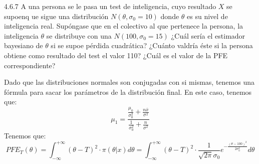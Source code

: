 \begin{problem}{4.6.7}
  A una persona se le pasa un test de inteligencia, cuyo resultado $X$ se supoenq ue sigue una distribución $N(\theta, \sigma_0 = 10)$ donde $\theta$ es su nivel de inteligencia real. Supóngase que en el colectivo al que pertenece la persona, la inteligencia $\theta$ se distribuye con una $N(100, \sigma_0 = 15)$ ¿Cuál sería el estimador bayesiano de $\theta$ si se supoe pérdida cuadrática? ¿Cuánto valdría éste si la persona obtiene como resultado del test el valor 110? ¿Cuál es el valor de la PFE correspondiente?
\end{problem}
\begin{sol}
  Dado que las distribuciones normales son conjugadas con si mismas, tenemos una fórmula para sacar los parámetros de la distribución final. En este caso, tenemos que:
  $$\mu_1 = \frac{\frac{\mu_0}{\sigma_0^2} + \frac{n\bar{x}}{\sigma^2}}{\frac{1}{\sigma_0^2} + \frac{n}{\sigma^2}}$$
  Tenemos que: 
  $$PFE_T(\theta) = \int_{-\infty}^{+\infty} (\theta - T)^2 \cdot \pi(\theta | x) d\theta = \int_{-\infty}^{+\infty} (\theta - T)^2 \cdot \frac{1}{\sqrt{2\pi}\sigma_0} e^{-\frac{(\theta - 100)^2}{2\sigma_0^2}} d\theta$$
\end{sol}